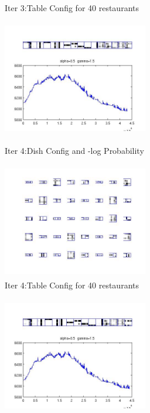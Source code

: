 \documentclass{article}
\begin{document}
\begin{spacing}{1.1}
\begin{figure}[h]
\begin{minipage}[b]{0.5\textwidth}
    \caption{Iter 3:Table Config for 40 restaurants}
    \label{fig:by:table}  
   \end{minipage}%
\end{figure}
\begin{figure}[h] 
  \begin{minipage}[b]{0.5\textwidth} 
    \centering 
    \includegraphics[width=2.5in,height=2in]{init1_5_nmt85_4d.jpg} 
    \caption{Iter 4:Dish Config and -log Probability}
    \label{fig:by:table} 
  \end{minipage}%
  \begin{minipage}[b]{0.5\textwidth} 
    \centering 
    \includegraphics[width=2.5in,height=2in]{init1_5_nmt85_4.jpg} 
    \caption{Iter 4:Table Config for 40 restaurants}
    \label{fig:by:table}  
   \end{minipage}%
\end{figure}
\begin{figure}[h] 
  \begin{minipage}[b]{0.5\textwidth} 
    \centering 
    \includegraphics[width=2.5in,height=2in]{init1_5_nmt85_5d.jpg} 

\end{minipage}
\end{figure}
\end{spacing}
\end{document}
